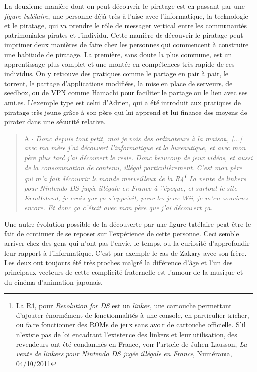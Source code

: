 La deuxième manière dont on peut découvrir le piratage est en passant par une \textit{figure tutélaire}, une personne déjà très à l'aise avec l'informatique, la technologie et le piratage, qui va prendre le rôle de messager vertical entre les communautés patrimoniales pirates et l'individu. Cette manière de découvrir le piratage peut imprimer deux manières de faire chez les personnes qui commencent à construire une habitude de piratage. La première, sans doute la plus commune, est un apprentissage plus complet et une montée en compétences très rapide de ces individus. On y retrouve des pratiques comme le partage en pair à pair, le torrent, le partage d'applications modifiées, la mise en place de serveurs, de seedbox, ou de VPN comme Hamachi pour faciliter le partage ou le lien avec ses ami.es. L'exemple type est celui d'Adrien, qui a été introduit aux pratiques de piratage très jeune grâce à son père qui lui apprend et lui finance des moyens de pirater dans une sécurité relative.

\begin{quote}
    A - \textit{Donc depuis tout petit, moi je vois des ordinateurs à la maison, [...] avec ma mère j'ai découvert l'informatique et la bureautique, et avec mon père plus tard j'ai découvert le reste. Donc beaucoup de jeux vidéos, et aussi de la consommation de contenu, illégal particulièrement. C'est mon père qui m'a fait découvrir le monde merveilleux de la R4\footnote{La R4, pour \textit{Revolution for DS} est un \textit{linker}, une cartouche permettant d'ajouter énormément de fonctionnalités à une console, en particulier tricher, ou faire fonctionner des ROMs de jeux sans avoir de cartouche officielle. S'il n'existe pas de loi encadrant l'existence des linkers et leur utilisation, des revendeurs ont été condamnés en France, voir l'article de Julien Lausson, \textit{La vente de linkers pour Nintendo DS jugée illégale en France}, Numérama, 04/10/2011} La vente de linkers pour Nintendo DS jugée illégale en France  à l'époque, et surtout le site EmulIsland, je crois que ça s'appelait, pour les jeux Wii, je m'en souviens encore. Et donc ça c'était avec mon père que j'ai découvert ça.}
\end{quote}

Une autre évolution possible de la découverte par une figure tutélaire peut être le fait de continuer de se reposer sur l'expérience de cette personne. Ceci semble arriver chez des gens qui n'ont pas l'envie, le temps, ou la curiosité d'approfondir leur rapport à l'informatique. C'est par exemple le cas de Zakary avec son frère. Les deux ont toujours été très proches malgré la différence d'âge et l'un des principaux vecteurs de cette complicité fraternelle est l'amour de la  musique et du cinéma d'animation japonais.

